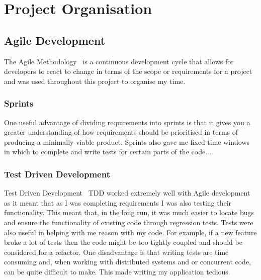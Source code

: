 \section{Project Organisation}

\subsection*{Agile Development}

The Agile Methodology~\cite{ilieva_analyses_2004} is a continuous development cycle that allows for developers to react to change in terms of the scope or requirements for a project and was used throughout this project to organise my time.


\subsubsection*{Sprints}
One useful advantage of dividing requirements into sprints is that it gives you a greater understanding of how requirements should be prioritised in terms of producing a minimally viable product.
\x
Sprints also gave me fixed time windows in which to complete and write tests for certain parts of the code.... 

\subsubsection*{Test Driven Development}
Test Driven Development~\cite{beck_test-driven_2003} TDD worked extremely well with Agile development as it meant that as I was completing requirements I was also testing their functionality. This meant that, in the long run, it was much easier to locate bugs and ensure the functionality of existing code through regression tests. 
\x
Tests were also useful in helping with me reason with my code. For example, if a new feature broke a lot of tests then the code might be too tightly coupled and should be considered for a refactor.
\x
One disadvantage is that writing tests are time consuming and, when working with distributed systems and or concurrent code, can be quite difficult to make. This made writing my application tedious.

